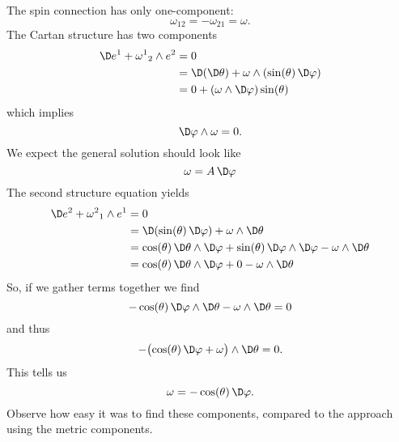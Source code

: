 \begin{ex}[2-Sphere]
The spin connection has only one-component:
\begin{equation}
\omega_{12}=-\omega_{21}=\omega.
\end{equation}
The Cartan structure has two components
\begin{subequations}
\begin{align}
\D e^{1}+{\omega^{1}}_{2}\wedge e^{2}
&=0\\
&=\D(\D\theta)+\omega\wedge(\sin(\theta)\,\D\varphi)\\
&=0+(\omega\wedge\D\varphi)\sin(\theta)
\end{align}
\end{subequations}
which implies
\begin{equation}
\D\varphi\wedge\omega=0.
\end{equation}
We expect the general solution should look like
\begin{equation}
\omega=A\,\D\varphi
\end{equation}
The second structure equation yields
\begin{subequations}
\begin{align}
\D e^{2}+{\omega^{2}}_{1}\wedge e^{1}
&=0\\
&=\D(\sin(\theta)\,\D\varphi)+\omega\wedge\D\theta\\
&=\cos(\theta)\,\D\theta\wedge\D\varphi
+\sin(\theta)\,\D\varphi\wedge\D\varphi
-\omega\wedge\D\theta\\
&=\cos(\theta)\,\D\theta\wedge\D\varphi+0-\omega\wedge\D\theta
\end{align}
\end{subequations}
So, if we gather terms together we find
\begin{equation}
-\cos(\theta)\,\D\varphi\wedge\D\theta-\omega\wedge\D\theta=0
\end{equation}
and thus
\begin{equation}
-\bigl(
\cos(\theta)\,\D\varphi+\omega
\bigr)\wedge\D\theta=0.
\end{equation}
This tells us
\begin{equation}
\omega=-\cos(\theta)\,\D\varphi.
\end{equation}
Observe how easy it was to find these components, compared to the
approach using the metric components.
\end{ex}
